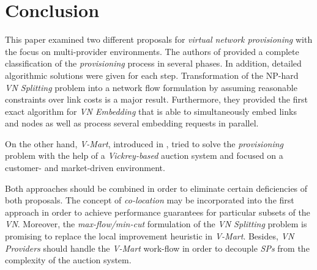 \documentclass[prodmode,acmtomccap]{acmlarge}
\begin{document}
 
 \section{Conclusion}
\label{sec:conclusion}
This paper examined two different proposals for \emph{virtual network provisioning} with the focus on multi-provider environments.
The authors of  provided a complete classification of the \emph{provisioning} process in several phases. 
In addition, detailed algorithmic solutions were given for each step. Transformation of the NP-hard \emph{VN Splitting} problem into 
a network flow formulation by assuming reasonable constraints over link costs is a major result. Furthermore, they provided the first
exact algorithm for \emph{VN Embedding} that is able to simultaneously embed links and nodes as well as process several embedding requests in parallel.

On the other hand, \emph{V-Mart}, introduced in , tried to solve the \emph{provisioning} problem with the help of a \emph{Vickrey-based} auction system and 
focused on a customer- and market-driven environment.

Both approaches should be combined in order to eliminate certain deficiencies of both proposals. The concept of \emph{co-location} may be incorporated into the first approach
in order to achieve performance guarantees for particular subsets of the \emph{VN}.
Moreover, the \emph{max-flow/min-cut} formulation of the \emph{VN Splitting} problem is promising to replace the local improvement heuristic in \emph{V-Mart}.
Besides, \emph{VN Providers} should handle the  \emph{V-Mart} work-flow in order to decouple \emph{SPs} from the complexity of the auction system.











\end{document}

